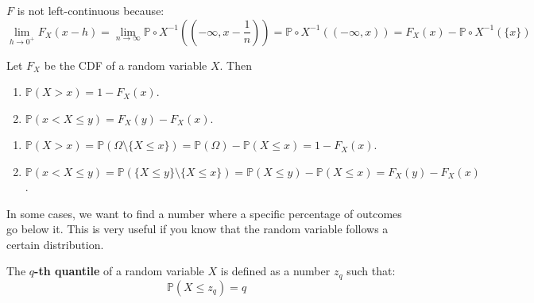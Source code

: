 \documentclass{huhtakm-template-book}
\newcommand{\prob}{\mathbb{P}}
\begin{document}
\begin{rem}
	$F$ is not left-continuous because:
	\begin{equation*}
		\lim_{h\to 0^{+}}F_{X}(x-h)=\lim_{n\to\infty}\prob\circ X^{-1}\left(\left(-\infty,x-\frac{1}{n}\right)\right)=\prob\circ X^{-1}((-\infty,x))=F_{X}(x)-\prob\circ X^{-1}(\{x\})
	\end{equation*}
\end{rem}
\begin{lem}
	Let $F_{X}$ be the CDF of a random variable $X$. Then
	\begin{enumerate}
		\item $\prob(X>x)=1-F_{X}(x)$.
		\item $\prob(x<X\leq y)=F_{X}(y)-F_{X}(x)$.
	\end{enumerate}
\end{lem}
\begin{proofing}
	\begin{enumerate}
		\item $\prob(X>x)=\prob(\Omega\setminus\{X\leq x\})=\prob(\Omega)-\prob(X\leq x)=1-F_{X}(x)$.
		\item $\prob(x<X\leq y)=\prob(\{X\leq y\}\setminus\{X\leq x\})=\prob(X\leq y)-\prob(X\leq x)=F_{X}(y)-F_{X}(x)$.
	\end{enumerate}
\end{proofing}
In some cases, we want to find a number where a specific percentage of outcomes go below it. This is very useful if you know that the random variable follows a certain distribution.
\begin{defn}
	The \textbf{$q$-th quantile} of a random variable $X$ is defined as a number $z_{q}$ such that:
	\begin{equation*}
		\prob(X\leq z_{q})=q
	\end{equation*}
\end{defn}
\end{document}
